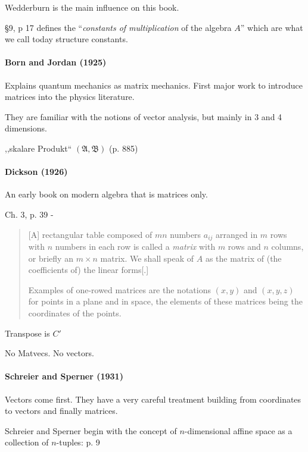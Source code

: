 Wedderburn is the main influence on this book.

\S 9, p 17 defines the ``\textit{constants of multiplication} of the algebra $A$''
which are what we call today structure constants.



\paragraph{Born and Jordan (1925)~\cite{Born1925}}

Explains quantum mechanics as matrix mechanics. First major work to introduce matrices into the physics literature.

They are familiar with the notions of vector analysis, but mainly in 3 and 4 dimensions.

,,skalare Produkt`` $(\mathfrak A, \mathfrak B)$ (p. 885)



\paragraph{Dickson (1926)~\cite{Dickson1926}}

An early book on modern algebra that is matrices only.


Ch. 3, p. 39 -
\begin{quote}
[A] rectangular table composed of $mn$ numbers $a_{ij}$ arranged in
$m$ rows with $n$ numbers in each row is called a \textit{matrix} with $m$ rows
and $n$ columns, or briefly an $m\times n$ matrix. We shall speak of $A$ as the
matrix of (the coefficients of) the linear forms[.]

Examples of one-rowed matrices are the notations $(x, y)$ and
$(x, y, z)$ for points in a plane and in space, the elements of these
matrices being the coordinates of the points.
\end{quote}

Transpose is $C'$

No Matvecs. No vectors.


\paragraph{Schreier and Sperner (1931)~\cite{Schreier1931}}

Vectors come first. They have a very careful treatment building from coordinates
to vectors and finally matrices.

Schreier and Sperner begin with the concept of $n$-dimensional affine space
as a collection of $n$-tuples: p. 9

